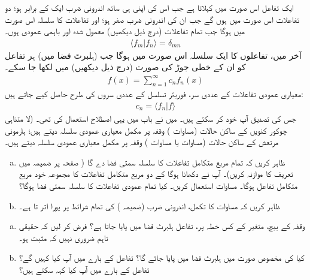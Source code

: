 ایک تفاعل اس صورت میں  کہلاتا ہے جب اس کی  اپنی  ہی ساتھ اندرونی ضرب ایک  کے برابر ہو؛ دو تفاعلات اس صورت میں   ہوں گے جب ان کی  اندرونی ضرب صفر   ہو؛  اور تفاعلات  کا سلسلہ اس صورت میں   ہوگا جب تمام تفاعلات (درج ذیل دیکھیں)   معمول شدہ اور باہمی  عمودی ہوں۔
\begin{align}
	\langle f_m | f_n \rangle = \delta_{mn}
\end{align}
آخر میں،  تفاعلوں کا ایک سلسلہ اس صورت میں  ہوگا جب (ہلبرٹ فضا میں)  ہر تفاعل کو ان کے خطی جوڑ کی صورت (درج ذیل دیکھیں)  میں  لکھا جا سکے۔
\begin{align}
	f(x) = \sum\limits_{n=1}^\infty c_{n} f_{n}(x)
\end{align}
معیاری عمودی تفاعلات       کے عددی سر،  فوریئر تسلسل کے  عددی سروں کی طرح    حاصل کیے جاتے ہیں:
\begin{align}
	c_{n} = \langle f_{n} | f \rangle
\end{align}
جس کی   تصدیق آپ خود کر سکتے ہیں۔ میں نے باب  میں یہی اصطلاح استعمال کی تھی۔ (لا متناہی چوکور کنویں کے ساکن حالات  (مساوات )  وقفہ  پر مکمل معیاری عمودی سلسلہ دیتے ہیں؛  ہارمونی مرتعش کے ساکن حالات (مساوات  یا  مساوات ) وقفہ  پر مکمل معیاری عمودی سلسلہ دیتے ہیں۔

\begin{enumerate}[a.]
\item
ظاہر کریں  کہ تمام   مربع متکامل  تفاعلات  کا سلسلہ سمتی  فضا دے گا ( صفحہ  پر ضمیمہ  میں تعریف کا موازنہ کریں)۔   آپ نے دکھانا  ہوگا کے دو  مربع متکامل  تفاعلات کا مجموعہ خود مربع متکامل  تفاعل  ہوگا۔  مساوات  استعمال کریں۔ کیا تمام عمودی تفاعلات  کا سلسلہ سمتی فضا ہوگا؟
 \item
 ظاہر کریں   کہ مساوات  کا تکمل،  اندرونی  ضرب (ضمیمہ ) کی  تمام شرائط پر پورا اتر تا ہے۔
 \end{enumerate}
\begin{enumerate}[a.]
\item
    وقفہ   کے بیچ،  متغیر    کے کس خطہ پر،       تفاعل   ہلبرٹ فضا میں پایا جاتا ہے؟ فرض کر لیں کہ  حقیقی تاہم ضروری نہیں کہ مثبت ہو۔
\item
 کیا  کی مخصوص صورت میں  ہلبرٹ فضا میں پایا جائے گا؟ تفاعل    کے بارے میں آپ کیا کہیں گے؟  تفاعل  کے بارے میں آپ کیا کہہ سکتے ہیں؟
 \end{enumerate}

